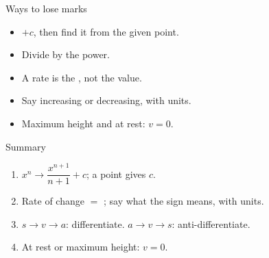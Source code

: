 \documentclass[aspectratio=169,11pt,t,xcolor=table]{beamer}
\begin{document}
\begin{frame}{Ways to lose marks}\relax
\begin{itemize}
\item[\lmnum{plusc}] $+c$, then find it from the given point.
\item[\lmnum{newpower}] Divide by the  power.
\item[\lmnum{value}] A rate is the \tderiv, not the value.
\item[\lmnum{meaning}] Say increasing or decreasing, with units.
\item[\lmnum{wrongzero}] Maximum height and at rest: $v=0$.
\end{itemize}
\end{frame}

\begin{frame}{Summary}\relax
{\sSum
\begin{enumerate}
\item $x^{n}\to\dfrac{x^{n+1}}{n+1}+c$; a point gives $c$.
\item Rate of change $=$ \tderiv; say what the sign means, with units.
\item $s\to v\to a$: differentiate. $a\to v\to s$: anti-differentiate.
\item At rest or maximum height: $v=0$.
\end{enumerate}}
\end{frame}
\end{document}
